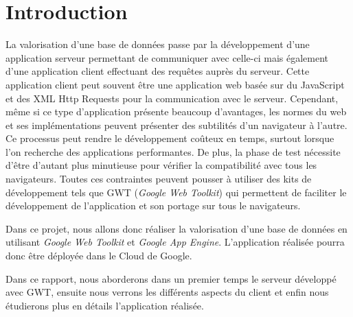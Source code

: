 \chapter{Introduction}

La valorisation d'une base de données passe par la développement d'une application serveur permettant de communiquer avec celle-ci mais également d'une application client effectuant des requêtes auprès du serveur. Cette application client peut souvent être une application web basée sur du JavaScript et des XML Http Requests pour la communication avec le serveur. Cependant, même si ce type d'application présente beaucoup d'avantages, les normes du web et ses implémentations peuvent présenter des subtilités d'un navigateur à l'autre. Ce processus peut rendre le développement coûteux en temps, surtout lorsque l'on recherche des applications performantes. De plus, la phase de test nécessite d'être d'autant plus minutieuse pour vérifier la compatibilité avec tous les navigateurs. Toutes ces contraintes peuvent pousser à utiliser des kits de développement tels que GWT (\textit{Google Web Toolkit}) qui permettent de faciliter le développement de l'application et son portage sur tous le navigateurs.

Dans ce projet, nous allons donc réaliser la valorisation d'une base de données en utilisant \textit{Google Web Toolkit} et \textit{Google App Engine}. L'application réalisée pourra donc être déployée dans le Cloud de Google.

Dans ce rapport, nous aborderons dans un premier temps le serveur développé avec GWT, ensuite nous verrons les différents aspects du client et enfin nous étudierons plus en détails l'application réalisée.